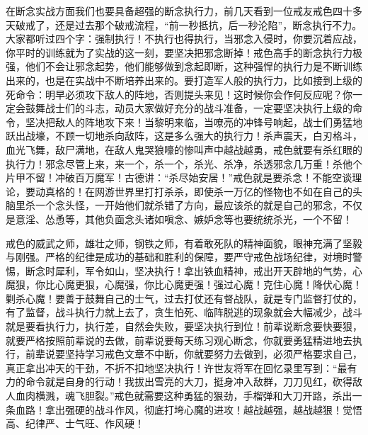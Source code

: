 在断念实战方面我们也要具备超强的断念执行力，前几天看到一位戒友戒色四十多天破戒了，还是过去那个破戒流程，“前一秒抵抗，后一秒沦陷”，断念执行不力。大家都听过四个字：强制执行！不执行也得执行，当邪念入侵时，你要沉着应战，你平时的训练就为了实战的这一刻，要坚决把邪念断掉！戒色高手的断念执行力极强，他们不会让邪念起势，他们能够做到念起即断，这种强悍的执行力是不断训练出来的，也是在实战中不断培养出来的。要打造军人般的执行力，比如接到上级的死命令：明早必须攻下敌人的阵地，否则提头来见！这时候你会作何反应呢？你一定会鼓舞战士们的斗志，动员大家做好充分的战斗准备，一定要坚决执行上级的命令，坚决把敌人的阵地攻下来！当黎明来临，当嘹亮的冲锋号响起，战士们勇猛地跃出战壕，不顾一切地杀向敌阵，这是多么强大的执行力！杀声震天，白刃格斗，血光飞舞，敌尸满地，在敌人鬼哭狼嚎的惨叫声中越战越勇，戒色就要有杀红眼的执行力！邪念尽管上来，来一个，杀一个，杀光、杀净，杀透邪念几万重！杀他个片甲不留！冲破百万魔军！古德讲：“杀尽始安居！”戒色就是要杀念！不能空谈理论，要动真格的！在网游世界里打打杀杀，即使杀一万亿的怪物也不如在自己的头脑里杀一个念头怪，一开始他们就杀错了方向，最应该杀的就是自己的邪念，不仅是意淫、怂恿等，其他负面念头诸如嗔念、嫉妒念等也要统统杀光，一个不留！

戒色的威武之师，雄壮之师，钢铁之师，有着敢死队的精神面貌，眼神充满了坚毅与刚强。严格的纪律是成功的基础和胜利的保障，要严守戒色战场纪律，对境时警惕，断念时犀利，军令如山，坚决执行！拿出铁血精神，戒出开天辟地的气势，心魔狠，你比心魔更狠，心魔强，你比心魔更强！强过心魔！克住心魔！降伏心魔！剿杀心魔！要善于鼓舞自己的士气，过去打仗还有督战队，就是专门监督打仗的，有了监督，战斗执行力就上去了，贪生怕死、临阵脱逃的现象就会大幅减少，战斗就是要看执行力，执行差，自然会失败，要坚决执行到位！前辈说断念要快要狠，就要严格按照前辈说的去做，前辈说要每天练习观心断念，你就要勇猛精进地去执行，前辈说要坚持学习戒色文章不中断，你就要努力去做到，必须严格要求自己，真正拿出冲天的干劲，不折不扣地坚决执行！许世友将军在回忆录里写到：“最有力的命令就是自身的行动！我拔出雪亮的大刀，挺身冲入敌群，刀刀见红，砍得敌人血肉横溅，魂飞胆裂。”戒色就需要这种勇猛的狠劲，手榴弹和大刀开路，杀出一条血路！拿出强硬的战斗作风，彻底打垮心魔的进攻！越战越强，越战越狠！觉悟高、纪律严、士气旺、作风硬！


